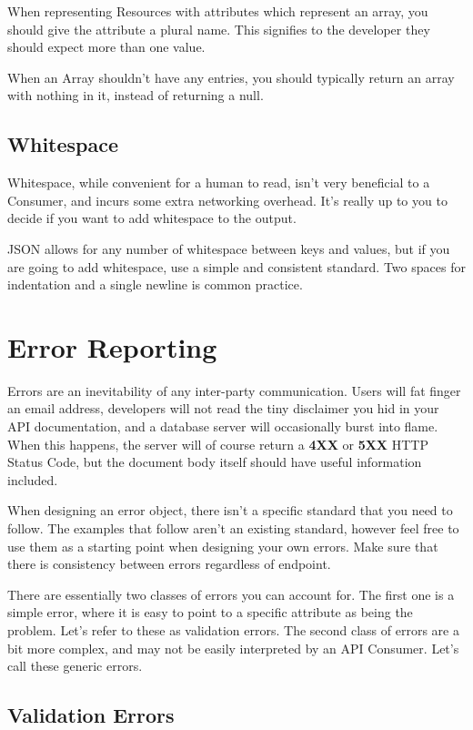 \documentclass{book}
\begin{document}
When representing Resources with attributes which represent an array, you should give the attribute a plural name. This signifies to the developer they should expect more than one value.

When an Array shouldn't have any entries, you should typically return an array with nothing in it, instead of returning a null.

\subsection{Whitespace}

Whitespace, while convenient for a human to read, isn't very beneficial to a Consumer, and incurs some extra networking overhead. It's really up to you to decide if you want to add whitespace to the output.

JSON allows for any number of whitespace between keys and values, but if you are going to add whitespace, use a simple and consistent standard. Two spaces for indentation and a single newline is common practice.

\section{Error Reporting}

Errors are an inevitability of any inter-party communication. Users will fat finger an email address, developers will not read the tiny disclaimer you hid in your API documentation, and a database server will occasionally burst into flame. When this happens, the server will of course return a \textbf{4XX} or \textbf{5XX} HTTP Status Code, but the document body itself should have useful information included.

When designing an error object, there isn't a specific standard that you need to follow. The examples that follow aren't an existing standard, however feel free to use them as a starting point when designing your own errors. Make sure that there is consistency between errors regardless of endpoint.

There are essentially two classes of errors you can account for. The first one is a simple error, where it is easy to point to a specific attribute as being the problem. Let's refer to these as validation errors. The second class of errors are a bit more complex, and may not be easily interpreted by an API Consumer. Let's call these generic errors.

\subsection{Validation Errors}
\end{document}
